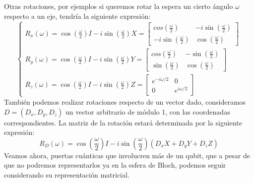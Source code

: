 \documentclass[a4paper]{article}
\numberwithin{equation}{section}
\begin{document}
Otras rotaciones, por ejemplos si queremos rotar la espera un cierto ángulo $\omega$ respecto a un eje, tendría la siguiente expresión:
\begin{equation}
\begin{cases}
R_x(\omega) = \cos(\frac{\omega}{2})I -i\sin(\frac{\omega}{2})X =
\begin{bmatrix}
cos(\frac{\omega}{2}) & -i\sin(\frac{\omega}{2}) \\
-i\sin(\frac{\omega}{2}) & \cos(\frac{\omega}{2})
\end{bmatrix} \\
R_y(\omega) = \cos(\frac{\omega}{2})I -i\sin(\frac{\omega}{2})Y =
\begin{bmatrix}
	cos(\frac{\omega}{2}) & -\sin(\frac{\omega}{2}) \\
	\sin(\frac{\omega}{2}) & \cos(\frac{\omega}{2})
\end{bmatrix} \\
R_z(\omega) = \cos(\frac{\omega}{2})I -i\sin(\frac{\omega}{2})Z =
\begin{bmatrix}
	e^{-i\omega/2} & 0 \\
	0 & e^{i\omega/2}
\end{bmatrix}
\end{cases}
\end{equation}
También podemos realizar rotaciones respecto de un vector dado, consideramos $D = (D_x, D_y, D_z)$ un vector arbitrario de módulo 1, con las coordenadas correspondientes. La matriz de la rotación estará determinada por la siguiente expresión:
\begin{equation}
R_D(\omega) = \cos(\frac{\omega}{2})I -i\sin(\frac{\omega}{2})(D_x X + D_y Y + D_z Z)
\end{equation}
Veamos ahora, puertas cuánticas que involucren más de un qubit, que a pesar de que no podremos representarlos ya en la esfera de Bloch, podemos seguir considerando su representación matricial.
\end{document}
